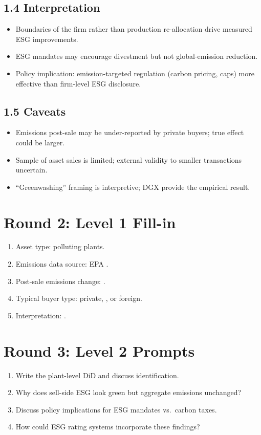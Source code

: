 \documentclass[11pt]{article}
\newcommand{\blank}[1]{\underline{\hspace{#1}}}
\begin{document}
\subsection*{1.4 Interpretation}
\begin{itemize}
\item Boundaries of the firm rather than production re-allocation drive measured ESG improvements.
\item ESG mandates may encourage divestment but not global-emission reduction.
\item Policy implication: emission-targeted regulation (carbon pricing, caps) more effective than firm-level ESG disclosure.
\end{itemize}

\subsection*{1.5 Caveats}
\begin{alertbox}
\begin{itemize}
\item Emissions post-sale may be under-reported by private buyers; true effect could be larger.
\item Sample of asset sales is limited; external validity to smaller transactions uncertain.
\item ``Greenwashing'' framing is interpretive; DGX provide the empirical result.
\end{itemize}
\end{alertbox}

\section*{Round 2: Level 1 Fill-in}
\begin{enumerate}
\item Asset type: polluting \blank{2cm} plants.
\item Emissions data source: EPA \blank{1cm}.
\item Post-sale emissions change: \blank{2cm}.
\item Typical buyer type: private, \blank{1cm}, or foreign.
\item Interpretation: \blank{1.5cm}.
\end{enumerate}

\section*{Round 3: Level 2 Prompts}
\begin{enumerate}
\item Write the plant-level DiD and discuss identification.
\item Why does sell-side ESG look green but aggregate emissions unchanged?
\item Discuss policy implications for ESG mandates vs.\ carbon taxes.
\item How could ESG rating systems incorporate these findings?
\end{enumerate}
\end{document}
